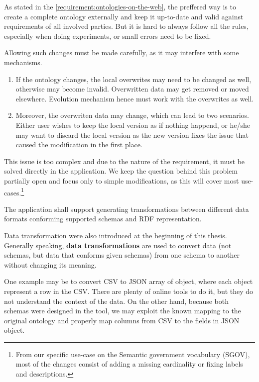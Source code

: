 As stated in the \autoref{requirement:ontologies-on-the-web}, the preffered way is to create a complete ontology externally and keep it up-to-date and valid against requirements of all involved parties. But it is hard to always follow all the rules, especially when doing experiments, or small errors need to be fixed.

Allowing such changes must be made carefully, as it may interfere with some mechanisms.
\begin{enumerate}
    \item If the ontology changes, the local overwrites may need to be changed as well, otherwise may become invalid. Overwritten data may get removed or moved elsewhere. Evolution mechanism hence must work with the overwrites as well.
    \item Moreover, the overwriten data may change, which can lead to two scenarios. Either user wishes to keep the local version as if nothing happend, or he/she may want to discard the local version as the new version fixes the issue that caused the modification in the first place.
\end{enumerate}

This issue is too complex and due to the nature of the requirement, it must be solved directly in the application. We keep the question behind this problem partially open and focus only to simple modifications, as this will cover most use-cases.\footnote{From our specific use-case on the Semantic government vocabulary (SGOV), most of the changes consist of adding a missing cardinality or fixing labels and descriptions.}


\begin{requirement}
    The application shall support generating transformations between different data formats conforming supported schemas and RDF representation.
\end{requirement}

Data transformation were also introduced at the beginning of this thesis. Generally speaking, \textbf{data transformations} are used to convert data (not schemas, but data that conforms given schemas) from one schema to another without changing its meaning.

One example may be to convert CSV to JSON array of object, where each object represent a row in the CSV. There are plenty of online tools to do it, but they do not understand the context of the data. On the other hand, because both schemas were designed in the tool, we may exploit the known mapping to the original ontology and properly map columns from CSV to the fields in JSON object.

